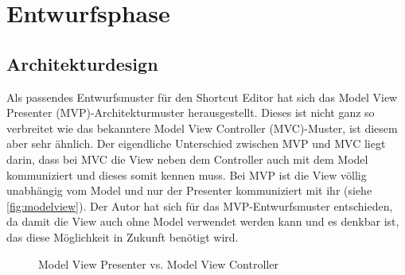 \section{Entwurfsphase}

\subsection{Architekturdesign}
\label{Architekturdesign}

Als passendes Entwurfsmuster für den Shortcut Editor hat sich das Model View Presenter (MVP)-Architekturmuster herausgestellt. Dieses ist nicht ganz so verbreitet wie das bekanntere Model View Controller (MVC)-Muster, ist diesem aber sehr ähnlich. Der eigendliche Unterschied zwischen MVP und MVC liegt darin, dass bei MVC die View neben dem Controller auch mit dem Model kommuniziert und dieses somit kennen muss. Bei MVP ist die View völlig unabhängig vom Model und nur der Presenter kommuniziert mit ihr (siehe \autoref{fig:modelview}). Der Autor hat sich für das MVP-Entwurfsmuster entschieden, da damit die View auch ohne Model verwendet werden kann und es denkbar ist, das diese Möglichkeit in Zukunft benötigt wird.

\begin{figure}[H] 
	\hfill 
	\caption{Model View Presenter vs. Model View Controller} 
	\label{fig:modelview}
\end{figure}

